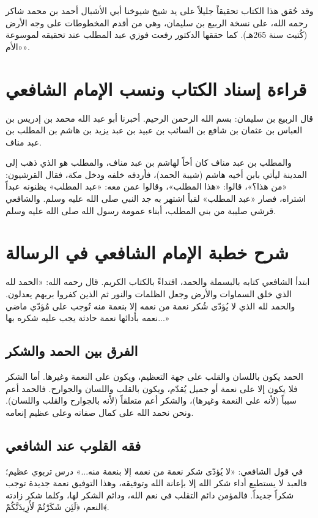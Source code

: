 وقد حُقق هذا الكتاب تحقيقاً جليلاً على يد شيخ شيوخنا أبي الأشبال أحمد بن محمد شاكر رحمه الله، على نسخة الربيع بن سليمان، وهي من أقدم المخطوطات على وجه الأرض (كُتبت سنة 265هـ). كما حققها الدكتور رفعت فوزي عبد المطلب عند تحقيقه لموسوعة «الأم».

\section{قراءة إسناد الكتاب ونسب الإمام الشافعي}
قال الربيع بن سليمان: بسم الله الرحمن الرحيم. أخبرنا أبو عبد الله محمد بن إدريس بن العباس بن عثمان بن شافع بن السائب بن عبيد بن عبد يزيد بن هاشم بن المطلب بن عبد مناف.

والمطلب بن عبد مناف كان أخاً لهاشم بن عبد مناف، والمطلب هو الذي ذهب إلى المدينة ليأتي بابن أخيه هاشم (شيبة الحمد)، فأردفه خلفه ودخل مكة، فقال القرشيون: «من هذا؟»، قالوا: «هذا المطلب»، وقالوا عمن معه: «عبد المطلب» يظنونه عبداً اشتراه، فصار «عبد المطلب» لقباً اشتهر به جد النبي صلى الله عليه وسلم. والشافعي قرشي صليبة من بني المطلب، أبناء عمومة رسول الله صلى الله عليه وسلم.

\section{شرح خطبة الإمام الشافعي في الرسالة}
ابتدأ الشافعي كتابه بالبسملة والحمد، اقتداءً بالكتاب الكريم. قال رحمه الله:
«الحمد لله الذي خلق السماوات والأرض وجعل الظلمات والنور ثم الذين كفروا بربهم يعدلون. والحمد لله الذي لا يُؤدّى شُكر نعمة من نعمه إلا بنعمة منه تُوجب على مُؤدّي ماضي نعمه بأدائها نعمة حادثة يجب عليه شكره بها...»

\subsection{الفرق بين الحمد والشكر}
الحمد يكون باللسان والقلب على جهة التعظيم، ويكون على النعمة وغيرها. أما الشكر فلا يكون إلا على نعمة أو جميل يُقدّم، ويكون بالقلب واللسان والجوارح. فالحمد أعم سبباً (لأنه على النعمة وغيرها)، والشكر أعم متعلقاً (لأنه بالجوارح والقلب واللسان). ونحن نحمد الله على كمال صفاته وعلى عظيم إنعامه.

\subsection{فقه القلوب عند الشافعي}
في قول الشافعي: «لا يُؤدّى شكر نعمة من نعمه إلا بنعمة منه...» درس تربوي عظيم؛ فالعبد لا يستطيع أداء شكر الله إلا بإعانة الله وتوفيقه، وهذا التوفيق نعمة جديدة توجب شكراً جديداً. فالمؤمن دائم التقلب في نعم الله، ودائم الشكر لها، وكلما شكر زادته النعم، ﴿لَئِن شَكَرْتُمْ لَأَزِيدَنَّكُمْ﴾.

